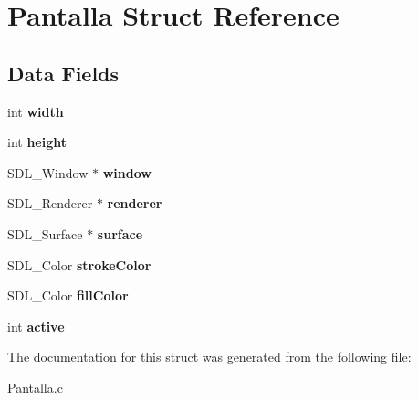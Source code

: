 \hypertarget{struct_pantalla}{}\section{Pantalla Struct Reference}
\label{struct_pantalla}
\subsection*{Data Fields}
\begin{DoxyCompactItemize}
\item 
\mbox{\label{struct_pantalla_a0e9fa97feaefd883cbd532f737d9554e}} 
int {\bfseries width}
\item 
\mbox{\label{struct_pantalla_ae15fda85fd6288ea074a7a1b300fd58a}} 
int {\bfseries height}
\item 
\mbox{\label{struct_pantalla_a8dec9e2d342435a93855aeb511ccd862}} 
S\+D\+L\+\_\+\+Window $\ast$ {\bfseries window}
\item 
\mbox{\label{struct_pantalla_aef7ea33823f4c47b5375139c124a8029}} 
S\+D\+L\+\_\+\+Renderer $\ast$ {\bfseries renderer}
\item 
\mbox{\label{struct_pantalla_a285cfe423fdb8f711ff813b909e0e52e}} 
S\+D\+L\+\_\+\+Surface $\ast$ {\bfseries surface}
\item 
\mbox{\label{struct_pantalla_abd2fd66b3aba1f8ade0bc7f132b63038}} 
S\+D\+L\+\_\+\+Color {\bfseries stroke\+Color}
\item 
\mbox{\label{struct_pantalla_ab15d952c42d74e338c2ca5ee6ff318c6}} 
S\+D\+L\+\_\+\+Color {\bfseries fill\+Color}
\item 
\mbox{\label{struct_pantalla_ad8de13a81c87bec0924e85e6ab14fac2}} 
int {\bfseries active}
\end{DoxyCompactItemize}


The documentation for this struct was generated from the following file\+:\begin{DoxyCompactItemize}
\item 
Pantalla.\+c\end{DoxyCompactItemize}
